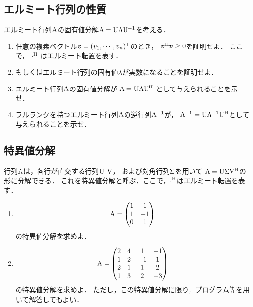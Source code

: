 \subsection{エルミート行列の性質}
  エルミート行列$\mathrm{A}$の固有値分解$\mathrm{A} = \mathrm{U}\mathrm{\Lambda}\mathrm{U}^{-1}$を考える．
  \begin{enumerate}[label=(\roman*)]
    \item 任意の複素ベクトル$\boldsymbol{v}=(v_1, \cdots, v_n)^\top$のとき，
      $\boldsymbol{v}^\mathrm{H} \boldsymbol{v} \geq 0$を証明せよ．
      ここで， $\cdot^\mathrm{H}$ はエルミート転置を表す．
    \item もしくはエルミート行列の固有値$\lambda$が実数になることを証明せよ．
    \item エルミート行列$\mathrm{A}$の固有値分解が
      $\mathrm{A} = \mathrm{U}\mathrm{\Lambda}\mathrm{U}^\mathrm{H}$ として与えられることを示せ．
    \item フルランクを持つエルミート行列$\mathrm{A}$の逆行列$\mathrm{A}^{-1}$が，
      $\mathrm{A}^{-1} = \mathrm{U}\mathrm{\Lambda}^{-1}\mathrm{U}^\mathrm{H}$として与えられることを示せ．
  \end{enumerate}

\subsection{特異値分解 \label{linalg:svd}}
  行列$\mathrm{A}$は，各行が直交する行列$\mathrm{U}, \mathrm{V}$，
  および対角行列$\mathrm{\Sigma}$を用いて
  $\mathrm{A}=\mathrm{U}\mathrm{\Sigma}\mathrm{V}^\mathrm{H}$の形に分解できる．
  これを特異値分解と呼ぶ．ここで，$\cdot^\mathrm{H}$はエルミート転置を表す．
  \begin{enumerate}[label=(\roman*)]
    \item
      \begin{equation}
        \mathrm{A} =
          \begin{pmatrix}
            1 & 1 \\
            1 & -1 \\
            0 & 1
          \end{pmatrix}
      \end{equation}
      の特異値分解を求めよ．
    \item
      \begin{equation}
        \mathrm{A} =
          \begin{pmatrix}
            2 & 4 & 1 &-1 \\
            1 & 2 & -1 & 1 \\
            2 & 1 & 1 & 2 \\
            1 & 3 & 2 & -3
          \end{pmatrix}
      \end{equation}の特異値分解を求めよ．
      ただし，この特異値分解に限り，プログラム等を用いて解答してもよい．
  \end{enumerate}

